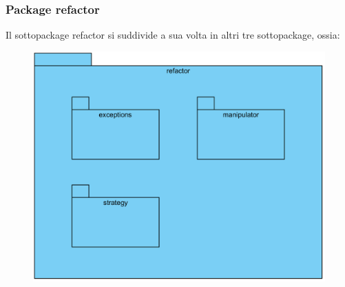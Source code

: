 \documentclass[11pt]{article}
\begin{document}
			\subsubsection{Package refactor}
			Il sottopackage refactor si suddivide a sua volta in altri tre sottopackage, ossia:
			\begin{figure}[!h]
				\centering
				\includegraphics{diagrams/RefactorPackageDiagram}
			\end{figure}
\end{document}
